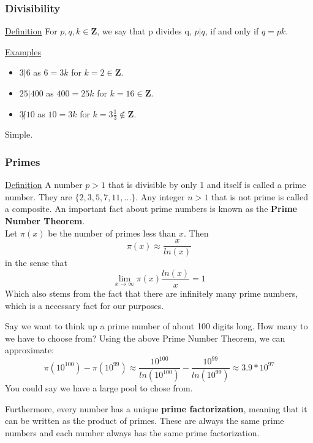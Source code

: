 \documentclass{article}
\begin{document}
        \subsubsection{Divisibility} 
        
        \underline{Definition} For $p, q, k \in\mathbf{Z}$, we say that p divides q, $p|q$, if and only if $q=pk$.
        
        \noindent\underline{Examples}
        \begin{itemize}
            \item $3|6$ as $6=3k$ for $k=2\in\mathbf{Z}$.
            \item $25|400$ as $400=25k$ for $k=16\in\mathbf{Z}$.
            \item $3\not|10$ as $10=3k$ for $k=3\frac{1}{3}\not\in\mathbf{Z}$.
        \end{itemize}
        Simple.
		
        \subsubsection{Primes}
        \underline{Definition} A number $p>1$ that is divisible by only 1 and itself is called a prime number.  They are $\{2,3,5,7,11,...\}$.  Any integer $n>1$ that is not prime is called a composite.  An important fact about prime numbers is known as the \textbf{Prime Number Theorem}.\\Let $\pi(x)$ be the number of primes less than $x$. Then $$\pi(x)\approx\frac{x}{ln(x)} $$ in the sense that $$\lim_{x\to\infty}\pi(x)\frac{ln(x)}{x}=1 $$ Which also stems from the fact that there are infinitely many prime numbers, which is a necessary fact for our purposes.
        
        Say we want to think up a prime number of about 100 digits long.  How many to we have to choose from?  
        Using the above Prime Number Theorem, we can approximate: $$\pi(10^{100})-\pi(10^{99})\approx\frac{10^{100}}{ln(10^{100})} - \frac{10^{99}}{ln(10^{99})} \approx 3.9*10^{97}$$
        You could say we have a large pool to chose from.
        
        Furthermore, every number has a unique \textbf{prime factorization}, meaning that it can be written as the product of primes.  These are always the same prime numbers and each number always has the same prime factorization.
        
\end{document}
